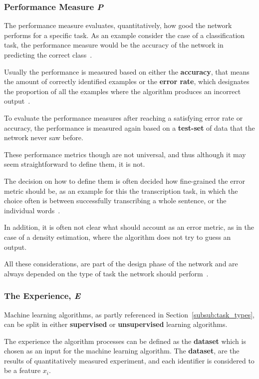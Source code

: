 \documentclass[12pt]{article}
\begin{document}
\subsubsection{Performance Measure \textit{P}}
\label{subsub:performance_measure}

The performance measure evaluates, quantitatively, how good the network performs for a specific task. As an example consider the case of a classification task, the performance measure would be the accuracy of the network in predicting the correct class~\citep{deeplearningbook}. 

Usually the performance is measured based on either the \textbf{accuracy}, that means the amount of correctly identified examples or the \textbf{error rate}, which designates the proportion of all the examples where the algorithm produces an incorrect output~\citep{deeplearningbook}.

To evaluate the performance measures after reaching a satisfying error rate or accuracy, the performance is measured again based on a \textbf{test-set} of data that the network never saw before. 

These performance metrics though are not universal, and thus although it may seem straightforward to define them, it is not.

The decision on how to define them is often decided how fine-grained the error metric should be, as an example for this the transcription task, in which the choice often is between successfully transcribing a whole sentence, or the individual words~\citep{deeplearningbook}. 

In addition, it is often not clear what should account as an error metric, as in the case of a density estimation, where the algorithm does not try to guess an output.

All these considerations, are part of the design phase of the network and are always depended on the type of task the network should perform~\citep{deeplearningbook}.

\subsubsection{The Experience, \textit{E}}
\label{subsub:the_experience}

Machine learning algorithms, as partly referenced in Section~\ref{subsub:task_types}, can be split in either \textbf{supervised} or \textbf{unsupervised} learning algorithms. 

The experience the algorithm processes can be defined as the \textbf{dataset} which is chosen as an input for the machine learning algorithm. The \textbf{dataset}, are the results of quantitatively measured experiment, and each identifier is considered to be a feature $x_i$.
\end{document}
